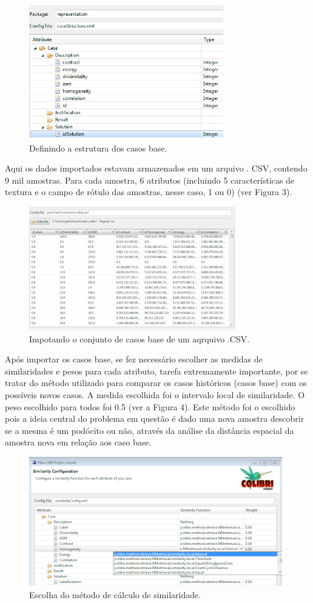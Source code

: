 \documentclass[conference]{IEEEtran}
\begin{document}
\begin{figure}[htbp]
	\centerline{\includegraphics{fig2.png}}
	\caption{Definindo a estrutura dos casos base.}
	\label{fig2}
\end{figure}

Aqui os dados importados estavam armazenados em um arquivo . CSV, contendo 9 mil amostras. Para cada amostra, 6 atributos (incluindo 5 características de textura e o campo de rótulo das amostras, nesse caso, 1 ou 0) (ver Figura 3).
\begin{figure}[htbp]
	\centerline{\includegraphics{fig3.png}}
	\caption{Impotando o conjunto de casos base de um aqrquivo .CSV.}
	\label{fig3}
\end{figure}

Após importar os casos base, se fez necessário escolher as medidas de similaridades e pesos para cada atributo, tarefa extremamente importante, por se tratar do método utilizado para comparar os casos históricos (casos base) com os possíveis novos casos. A medida escolhida foi o intervalo local de similaridade. O peso escolhido para todos foi 0.5 (ver a Figura 4). Este método foi o escolhido pois a ideia central do problema em questão é dado uma nova amostra descobrir se a mesma é um podócito ou não, através da análise da distância espacial da amostra nova em relação aos caso base. 

\begin{figure}[htbp]
	\centerline{\includegraphics{fig4.png}}
	\caption{Escolha do método de cálculo de similaridade.}
	\label{fig4}
\end{figure}
\end{document}
